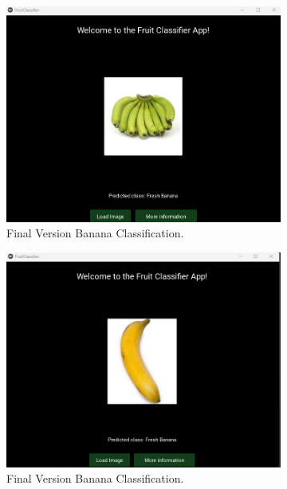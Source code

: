 \documentclass[conference]{IEEEtran}
\begin{document}
\begin{figure}[h]
\begin{subfigure}[b]{0.48\linewidth}
        \centering
        \includegraphics[width=\linewidth]{Mlayer banana2.png}
        \caption{Final Version Banana Classification.}
        \label{figFB}
    \end{subfigure}
    \hfill
    \begin{subfigure}[b]{0.48\linewidth}
        \centering
        \includegraphics[width=\linewidth]{Mlayer banana3.png}
        \caption{Final Version Banana Classification.}
        \label{figFB}
    \end{subfigure}
    \hfill
    \begin{subfigure}[b]{0.48\linewidth}
        \centering

\end{subfigure}
\end{figure}
\end{document}
